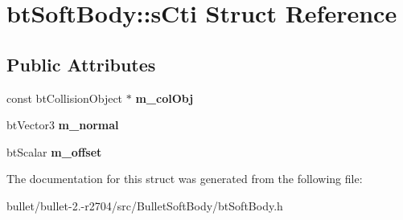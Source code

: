 \hypertarget{structbt_soft_body_1_1s_cti}{\section{bt\+Soft\+Body\+:\+:s\+Cti Struct Reference}
\label{structbt_soft_body_1_1s_cti}
}
\subsection*{Public Attributes}
\begin{DoxyCompactItemize}
\item 
\hypertarget{structbt_soft_body_1_1s_cti_a2ec6effa23b4f92a44f17477f254078f}{const bt\+Collision\+Object $\ast$ {\bfseries m\+\_\+col\+Obj}}\label{structbt_soft_body_1_1s_cti_a2ec6effa23b4f92a44f17477f254078f}

\item 
\hypertarget{structbt_soft_body_1_1s_cti_ae668ef16af4314e979f47d1ab28fc5f9}{bt\+Vector3 {\bfseries m\+\_\+normal}}\label{structbt_soft_body_1_1s_cti_ae668ef16af4314e979f47d1ab28fc5f9}

\item 
\hypertarget{structbt_soft_body_1_1s_cti_ac3028faa276435d90944dd2b72b533b8}{bt\+Scalar {\bfseries m\+\_\+offset}}\label{structbt_soft_body_1_1s_cti_ac3028faa276435d90944dd2b72b533b8}

\end{DoxyCompactItemize}


The documentation for this struct was generated from the following file\+:\begin{DoxyCompactItemize}
\item 
bullet/bullet-\/2.-\/r2704/src/\+Bullet\+Soft\+Body/bt\+Soft\+Body.\+h\end{DoxyCompactItemize}

